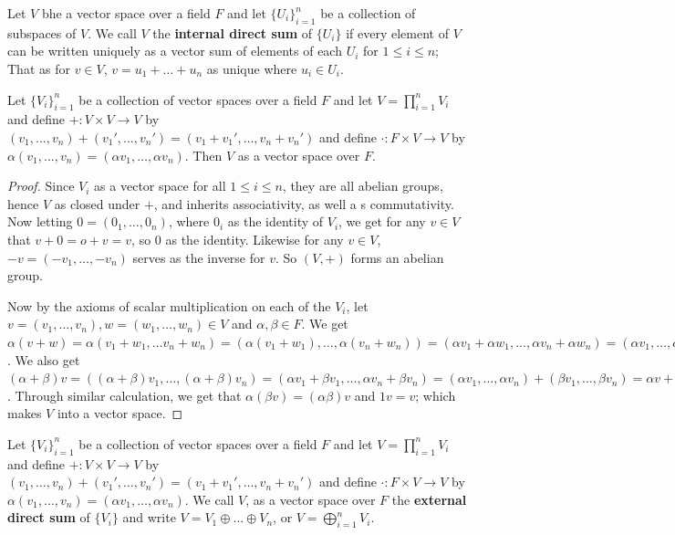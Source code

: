 \begin{definition}
    Let $V$ bhe a vector space over a field  $F$ and let  $\{U_i\}_{i=1}^n$ be a
    collection of subspaces of $V$. We call $V$ the \textbf{internal direct
    sum} of $\{U_i\}$ if every element of $V$ can be written uniquely as a 
    vector sum of elements of each $U_i$ for $1 \leq i \leq n$; That as  for 
    $v \in V$, $v=u_1+\dots+u_n$ as unique where $u_i \in U_i$.
\end{definition}

\begin{lemma}
    Let $\{V_i\}_{i=1}^n$ be a collection of vector spaces over a field $F$ and
    let  $V=\prod_{i=1}^n{V_i}$ and define $+:V \times V \rightarrow V$ by
    $(v_1, \dots, v_n)+(v_1', \dots, v_n')=(v_1+v_1', \dots, v_n+v_n')$ and
    define $\cdot:F \times V \rightarrow V$ by $\alpha(v_1, \dots, v_n)=(\alpha
    v_1, \dots, \alpha v_n)$. Then $V$ as a vector space over  $F$.
\end{lemma}
\begin{proof}
    Since $V_i$ as a vector space for all  $1 \leq i \leq n$, they are all
    abelian groups, hence  $V$ as closed under  $+$, and inherits associativity,
    as well a s commutativity. Now letting  $0=(0_1, \dots, 0_n)$, where $0_i$ 
    as the identity of  $V_i$, we get for any  $v \in V$ that  $v+0=o+v=v$, so  
    $0$ as the identity. Likewise for any  $v \in V$,  $-v=(-v_1, \dots, -v_n)$
    serves as the inverse for $v$. So  $(V,+)$ forms an abelian group.

    Now by the axioms of scalar multiplication on each of the $V_i$, let
    $v=(v_1, \dots, v_n),w=(w_1, \dots, w_n) \in V$ and $\alpha,\beta \in F$. We
    get  $\alpha(v+w)=\alpha(v_1+w_1, \dots v_n+w_n)=(\alpha(v_1+w_1), \dots,
    \alpha(v_n+w_n))=(\alpha v_1+\alpha w_1, \dots, \alpha v_n+\alpha
    w_n)=(\alpha v_1, \dots, \alpha v_n)+(\alpha w_1, \dots, \alpha w_n)=\alpha
    v+\alpha w$. We also get $(\alpha+\beta)v=((\alpha+\beta)v_1, \dots,
    (\alpha+\beta)v_n)=(\alpha v_1+\beta v_1, \dots, \alpha v_n+\beta
    v_n)=(\alpha v_1, \dots, \alpha v_n)+(\beta v_1, \dots, \beta v_n)=\alpha
    v+\beta v$. Through similar calculation, we get that $\alpha(\beta
    v)=(\alpha\beta)v$ and $1v=v$; which makes  $V$ into a vector space.
\end{proof}

\begin{definition}
    Let $\{V_i\}_{i=1}^n$ be a collection of vector spaces over a field $F$ and
    let  $V=\prod_{i=1}^n{V_i}$ and define $+:V \times V \rightarrow V$ by
    $(v_1, \dots, v_n)+(v_1', \dots, v_n')=(v_1+v_1', \dots, v_n+v_n')$ and
    define $\cdot:F \times V \rightarrow V$ by $\alpha(v_1, \dots, v_n)=(\alpha
    v_1, \dots, \alpha v_n)$. We call $V$, as a vector space over  $F$ the
    \textbf{external direct sum} of $\{V_i\}$ and write $V=V_1 \oplus \dots
    \oplus V_n$, or $V=\bigoplus_{i=1}^n{V_i}$.
\end{definition}

